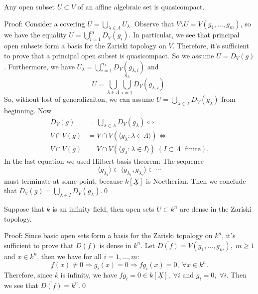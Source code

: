\begin{dang}
    \begin{lemma}
        Any open subset $U\subset V$ of an affine algebraic set is quasicompact.
    \end{lemma}
\end{dang}
Proof: Consider a covering $U=\bigcup_{\lambda\in\Lambda}U_\lambda$.
Observe that $V\setminus U=V(g_1,\dots, g_m)$, so we have the equality $U=\bigcup_{i=1}^m D_V(g_i)$. In particular, we see 
that principal open subsets form a basis for the Zariski topology on $V$. Therefore, 
it's sufficient to prove that a principal open subset is quasicompact. So we assume $U=D_V(g)$. Furthermore, we have 
$U_\lambda = \bigcup_{i=1}^{n_\lambda}D_V(g_{\lambda,i})$ and 
\begin{equation}
    U=\bigcup_{\lambda\in\Lambda}\bigcup_{i=1}^{n_\lambda}D_V(g_{\lambda,i}).
\end{equation}
So, without lost of generalizaiton, we can assume $U=\bigcup_{\lambda\in\Lambda}D_V(g_\lambda)$ from beginning. Now 
\begin{equation}
    \begin{split}
        D_V(g) & = \bigcup_{\lambda\in\Lambda}D_V(g_\lambda)\iff\\
      V\cap V(g) &= V\cap V(\langle g_\lambda:\lambda\in\Lambda\rangle)\iff\\ 
      V\cap V(g) &= V\cap V(\langle g_\lambda:\lambda\in I\rangle)\;(I\subset \Lambda\;\text{ finite}).
    \end{split}
\end{equation}
In the last equation we used Hilbert basis theorem: The sequence
\begin{equation}
    \langle g_{\lambda_1} \rangle \subset  \langle g_{\lambda_1},g_{\lambda_2} \rangle \subset \cdots 
\end{equation}
must terminate at some point, because $k[\underline{X}]$ is Noetherian. Then we conclude that 
$D_V(g)=\bigcup_{\lambda\in I}D_V(g_\lambda)$.\qed


\begin{dang}
    \begin{lemma}
        Suppose that $k$ is an infinity field, then open sets $U\subset k^n$ are dense in the Zariski topology.
    \end{lemma}
\end{dang}
Proof: Since basic open sets form a basis for the Zariski topology on $k^n$, it's sufficient to prove that 
$D(f)$ is dense in $k^n$. Let $\overline{D(f)}=V(g_1,\dots, g_m),\;m\geq1$ and $x\in k^n$, then we have 
for all $i=1,\dots, m$:
\begin{equation}
    f(x)\neq0\Rightarrow g_i(x) = 0\Rightarrow fg_i(x)=0,\;\forall x\in k^n.
\end{equation}
Therefore, since $k$ is infinity, we have $fg_i=0\in k[\underline{X}],\;\forall i$ and $g_i=0,\;\forall i$. Then we see that 
$\overline{D(f)}=k^n$.\qed


